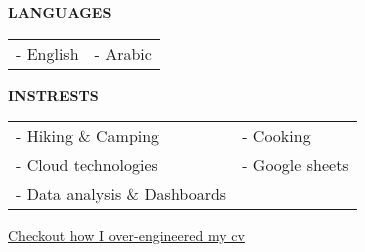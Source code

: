 \medskip
\divider

\textcolor{VividPurple}{\textbf{LANGUAGES}}
\medskip

\begin{tabular}{ l l } 
	- English & - Arabic \\
\end{tabular}  


\divider

\textcolor{VividPurple}{\textbf{INSTRESTS}}
\medskip

\begin{tabular}{ l l } 
	- Hiking \& Camping  & - Cooking       \\
	- Cloud technologies & - Google sheets \\
	- Data analysis \& Dashboards
\end{tabular}


\medskip
\medskip

\textcolor{VividPurple}{\href{https://github.com/MichaelSafwatHanna/cv}{\small * Checkout how I over-engineered my cv \hspace{0.5em}\faCode}}